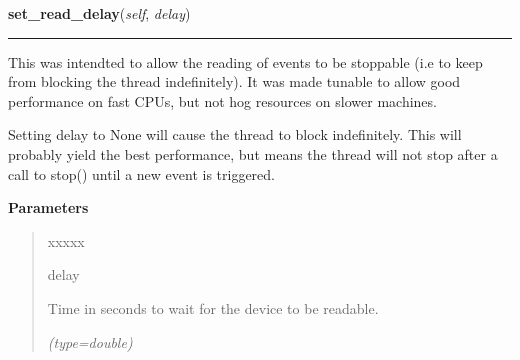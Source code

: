 \hspace{.8\funcindent}\begin{boxedminipage}{\funcwidth}

    \raggedright \textbf{set\_read\_delay}(\textit{self}, \textit{delay})

    \vspace{-1.5ex}

    \rule{\textwidth}{0.5\fboxrule}
\setlength{\parskip}{2ex}
    This was intendted to allow the reading of events to be stoppable (i.e 
    to keep from blocking the thread indefinitely). It was made tunable to 
    allow good performance on fast CPUs, but not hog resources on slower 
    machines.

    Setting delay to None will cause the thread to block indefinitely. This
    will probably yield the best performance, but means the thread will not
    stop after a call to stop() until a new event is triggered.

\setlength{\parskip}{1ex}
      \textbf{Parameters}
      \vspace{-1ex}

      \begin{quote}
        \begin{Ventry}{xxxxx}

          \item[delay]

          Time in seconds to wait for the device to be readable.

            {\it (type=double)}

        \end{Ventry}

      \end{quote}

    \end{boxedminipage}

    \label{PowerMateEventHandler:PowerMateEventHandler:set_double_click_time}

    \vspace{0.5ex}

